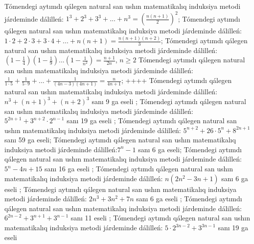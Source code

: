 Tómendegi aytımdı qálegen natural san ushın matematikalıq induksiya metodi járdeminde dálilleń: \(1^{3} + 2^{3} + 3^{3} + ... + n^{3} = \left( \frac{n(n + 1)}{2} \right)^{2}\);
Tómendegi aytımdı qálegen natural san ushın matematikalıq induksiya metodi járdeminde dálilleń: \(1 \cdot 2 + 2 \cdot 3 + 3 \cdot 4 + ... + n(n + 1) = \frac{n(n + 1)(n + 2)}{3}\);
Tómendegi aytımdı qálegen natural san ushın matematikalıq induksiya metodi járdeminde dálilleń: \(\left( 1 - \frac{1}{4} \right)\left( 1 - \frac{1}{9} \right)...\left( 1 - \frac{1}{n^{2}} \right) = \frac{n + 1}{2n}\), \(n \geq 2\)
Tómendegi aytımdı qálegen natural san ushın matematikalıq induksiya metodi járdeminde dálilleń: \(\frac{1}{1 \cdot 5} + \frac{1}{5 \cdot 9} + ... + \frac{1}{(4n - 3)(4n + 1)} = \frac{n}{4n + 1}\);
++++
Tómendegi aytımdı qálegen natural san ushın matematikalıq induksiya metodi járdeminde dálilleń: \(n^{3} + (n + 1)^{3} + (n + 2)^{3}\) sanı 9 ga eseli ;
Tómendegi aytımdı qálegen natural san ushın matematikalıq induksiya metodi járdeminde dálilleń: \(5^{2n + 1} + 3^{n + 2} \cdot 2^{n - 1}\) sanı 19 ga eseli ;
Tómendegi aytımdı qálegen natural san ushın matematikalıq induksiya metodi járdeminde dálilleń: \(5^{n + 2} + 26 \cdot 5^{n} + 8^{2n + 1}\) sanı 59 ga eseli;
Tómendegi aytımdı qálegen natural san ushın matematikalıq induksiya metodi járdeminde dálilleń:\(7^{n} - 1\) sanı 6 ga eseli;
Tómendegi aytımdı qálegen natural san ushın matematikalıq induksiya metodi járdeminde dálilleń: \(5^{n} - 4n + 15\) sanı 16 ga eseli ;
Tómendegi aytımdı qálegen natural san ushın matematikalıq induksiya metodi járdeminde dálilleń: \(n\left( 2n^{2} - 3n + 1 \right)\) sanı 6 ga eseli ;
Tómendegi aytımdı qálegen natural san ushın matematikalıq induksiya metodi járdeminde dálilleń: \(2n^{3} + 3n^{2} + 7n\) sanı 6 ga eseli ;
Tómendegi aytımdı qálegen natural san ushın matematikalıq induksiya metodi járdeminde dálilleń: \(6^{2n - 2} + 3^{n + 1} + 3^{n - 1}\) sanı 11 eseli ;
Tómendegi aytımdı qálegen natural san ushın matematikalıq induksiya metodi járdeminde dálilleń: \(5 \cdot 2^{3n - 2} + 3^{3n - 1}\) sanı 19 ga eseli